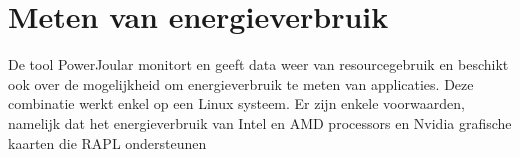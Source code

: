 \section{Meten van energieverbruik}
De tool PowerJoular monitort en geeft data weer van resourcegebruik en beschikt ook over de mogelijkheid om energieverbruik te meten van applicaties. Deze combinatie werkt enkel op een Linux systeem. Er zijn enkele voorwaarden, namelijk dat het energieverbruik van Intel en AMD processors en Nvidia grafische kaarten die RAPL ondersteunen \autocite{Noureddine2022}


